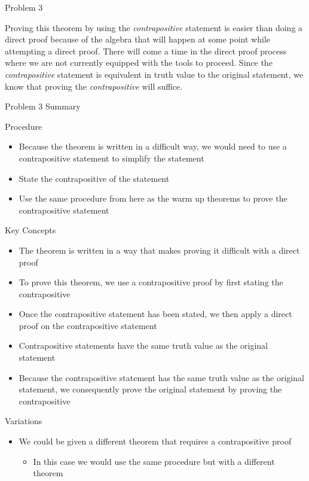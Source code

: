 \begin{problem}{Problem 3}
    \begin{highlight}[Insights]
        Proving this theorem by using the \textit{contrapositive} statement is easier than doing a direct proof because of the algebra that will happen at some point while attempting a direct proof.
        There will come a time in the direct proof process where we are not currently equipped with the tools to proceed. Since the \textit{contrapositive} statement is equivalent in truth value to
        the original statement, we know that proving the \textit{contrapositive} will suffice.
    \end{highlight}
\end{problem}

\begin{summary}{Problem 3 Summary}
    \begin{statement}{Procedure}
        \begin{itemize}
            \item Because the theorem is written in a difficult way, we would need to use a contrapositive statement to simplify the statement
            \item State the contrapositive of the statement
            \item Use the same procedure from here as the warm up theorems to prove the contrapositive statement
        \end{itemize}
    \end{statement}
    \begin{statement}{Key Concepts}
        \begin{itemize}
            \item The theorem is written in a way that makes proving it difficult with a direct proof
            \item To prove this theorem, we use a contrapositive proof by first stating the contrapositive
            \item Once the contrapositive statement has been stated, we then apply a direct proof on the contrapositive statement
            \item Contrapositive statements have the same truth value as the original statement
            \item Because the contrapositive statement has the same truth value as the original statement, we consequently prove the original statement by proving the contrapositive
        \end{itemize}
    \end{statement}
    \begin{statement}{Variations}
        \begin{itemize}
            \item We could be given a different theorem that requires a contrapositive proof
            \begin{itemize}
                \item In this case we would use the same procedure but with a different theorem
            \end{itemize}
        \end{itemize}
    \end{statement}
\end{summary}


